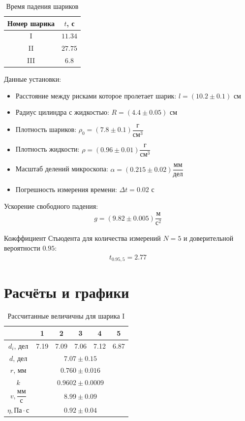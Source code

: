 \documentclass{article}
\begin{document}
\begin{table}[H]
   \centering
   \begin{tabular}{|c|c|} \hline
    Номер шарика & $t$, с \\ \hline
   I & $11.34$ \\ \hline
   II & $27.75$ \\ \hline
   III & $6.8$ \\ \hline
   \end{tabular}
   \caption{Время падения шариков}
\end{table}

Данные установки:
\begin{itemize}
    \item Расстояние между рисками которое пролетает шарик: $l = (10.2\pm0.1)$ см
    \item Радиус цилиндра с жидкостью: $R = (4.4\pm0.05)$ см
    \item Плотность шариков: $\rho_0 = (7.8\pm0.1) \dfrac{\text{г}}{\text{см}^3}$ 
    \item Плотность жидкости: $\rho = (0.96\pm0.01) \dfrac{\text{г}}{\text{см}^3}$ 
    \item Масштаб делений микроскопа: $\alpha = (0.215 \pm 0.02) \dfrac{\text{мм}}{\text{дел}} $
    \item Погрешность измерения времени: $\Delta t = 0.02$ с
\end{itemize}

Ускорение свободного падения:
\begin{gather*}
    g = (9.82 \pm 0.005) \dfrac{\text{м}}{\text{с}^2}
\end{gather*}

Кожффициент Стьюдента для количества измерений $N = 5$ и доверительной вероятности $0.95$:
\begin{gather*}
    t_{ 0.95, 5} = 2.77
\end{gather*}

\section{Расчёты и графики}
\begin{table}[H]
   \centering
   \begin{tabular}{|c|c|c|c|c|c|} \hline
       & 1 & 2 & 3 & 4 & 5 \\ \hline
       $d_i$, дел & 7.19 & 7.09 & 7.06 & 7.12 & 6.87 \\ \hline
       $d$, дел & \multicolumn{5}{|c|}{$7.07 \pm 0.15$} \\ \hline
       $r$, мм & \multicolumn{5}{|c|}{$0.760 \pm 0.016$} \\ \hline
       $k$ & \multicolumn{5}{|c|}{$0.9602 \pm 0.0009$} \\ \hline
       $v , \dfrac{ \text{мм}}{ \text{с}}$ & \multicolumn{5}{|c|}{$8.99 \pm 0.09$} \\ \hline
       $\eta , \text{Па}\cdot\text{с}$ &  \multicolumn{5}{|c|}{$0.92 \pm 0.04$} \\ \hline 
   \end{tabular}
   \caption{Рассчитанные величичны для шарика I}
\end{table}
\end{document}
